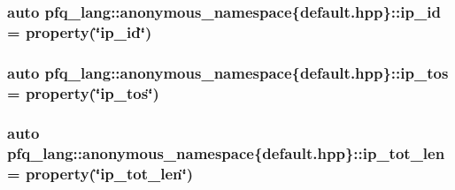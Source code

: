 \hypertarget{namespacepfq__lang_1_1anonymous__namespace_02default_8hpp_03_a7e1fd2e2131451ca8afe2f8ab07b97a8}{
\subsubsection[{ip\+\_\+id}]{\setlength{\rightskip}{0pt plus 5cm}auto pfq\+\_\+lang\+::anonymous\+\_\+namespace\{default.\+hpp\}\+::ip\+\_\+id = {\bf property}(\char`\"{}ip\+\_\+id\char`\"{})}}\label{namespacepfq__lang_1_1anonymous__namespace_02default_8hpp_03_a7e1fd2e2131451ca8afe2f8ab07b97a8}
\hypertarget{namespacepfq__lang_1_1anonymous__namespace_02default_8hpp_03_afc29e9877341008196788bba2bde3e04}{
\subsubsection[{ip\+\_\+tos}]{\setlength{\rightskip}{0pt plus 5cm}auto pfq\+\_\+lang\+::anonymous\+\_\+namespace\{default.\+hpp\}\+::ip\+\_\+tos = {\bf property}(\char`\"{}ip\+\_\+tos\char`\"{})}}\label{namespacepfq__lang_1_1anonymous__namespace_02default_8hpp_03_afc29e9877341008196788bba2bde3e04}
\hypertarget{namespacepfq__lang_1_1anonymous__namespace_02default_8hpp_03_a172d424ed5943dda09a80d7c63be9490}{
\subsubsection[{ip\+\_\+tot\+\_\+len}]{\setlength{\rightskip}{0pt plus 5cm}auto pfq\+\_\+lang\+::anonymous\+\_\+namespace\{default.\+hpp\}\+::ip\+\_\+tot\+\_\+len = {\bf property}(\char`\"{}ip\+\_\+tot\+\_\+len\char`\"{})}}\label{namespacepfq__lang_1_1anonymous__namespace_02default_8hpp_03_a172d424ed5943dda09a80d7c63be9490}

